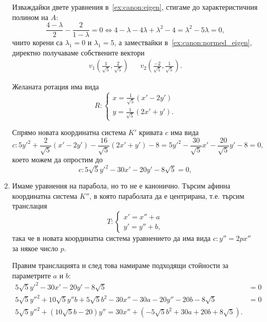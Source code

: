 \documentclass[numbers=endperiod, DIV=15, bibliography=totocnumbered]{scrartcl}
\begin{document}
\begin{solution}
\begin{enumerate}
    Изваждайки двете уравнения в~\ref{ex:canon:eigen}, стигаме до характеристичния полином на $A$:
    \begin{displaymath}
      \frac {4 - \lambda} 2 - \frac 2 {1 - \lambda} = 0 \iff 4 - \lambda - 4\lambda + \lambda^2 - 4 = \lambda^2 - 5\lambda = 0,
    \end{displaymath}
    чиито корени са $\lambda_1 = 0$ и $\lambda_1 = 5$, а замествайки в~\ref{ex:canon:normed_eigen}, директно получаваме собствените вектори
    \begin{align*}
      v_1 \left(\frac 1 {\sqrt 5}, \frac 2 {\sqrt 5} \right)
      &&
      v_2 \left(\frac {-2} {\sqrt 5}, \frac 1 {\sqrt 5} \right).
    \end{align*}

    Желаната ротация има вида
    \begin{displaymath}
      R: \begin{cases}
        x = \frac 1 {\sqrt 5} (x' - 2y') \\
        y = \frac 1 {\sqrt 5} (2x' + y').
      \end{cases}
    \end{displaymath}

    Спрямо новата координатна система $K'$ кривата $c$ има вида
    \begin{displaymath}
      c: 5y'^2 + \frac 2 {\sqrt 5} (x' - 2y') - \frac {16} {\sqrt 5} (2x' + y') - 8 = 5y'^2 - \frac {30} {\sqrt 5} x' - \frac {20} {\sqrt 5} y' - 8 = 0,
    \end{displaymath}
    което можем да опростим до
    \begin{displaymath}
      c: 5 \sqrt 5 y'^2 - 30 x' - 20 y' - 8 \sqrt 5 = 0,
    \end{displaymath}

    \item Имаме уравнения на парабола, но то не е канонично. Търсим афинна координатна система $K''$, в която параболата да е центрирана, т.е. търсим транслация
    \begin{displaymath}
      T: \begin{cases}
        x' = x'' + a \\
        y' = y'' + b,
      \end{cases}
    \end{displaymath}
    така че в новата координатна система уравнението да има вида $c: y'' = 2px''$ за някое число $p$.

    Правим транслацията и след това намираме подходящи стойности за параметрите $a$ и $b$:
    \begin{align*}
      5 \sqrt 5 y'^2 - 30 x' - 20 y' - 8 \sqrt 5 &= 0 \\
      5 \sqrt 5 y''^2 + 10 \sqrt 5 y'' b + 5 \sqrt 5 b^2 - 30 x'' - 30a - 20 y'' - 20b - 8 \sqrt 5 &= 0 \\
      5 \sqrt 5 y''^2 + (10 \sqrt 5 b - 20) y'' = 30 x'' + (- 5 \sqrt 5 b^2 + 30a + 20b + 8 \sqrt 5).
    \end{align*}


\end{enumerate}
\end{solution}
\end{document}
